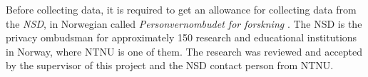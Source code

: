     Before collecting data, it is required to get an allowance for collecting data from the {\it NSD}, in Norwegian called {\it Personvernombudet for forskning} \cite{personvernombud}. The NSD is the privacy ombudsman for approximately 150 research and educational institutions in Norway, where NTNU is one of them. The research was reviewed and accepted by the supervisor of this project and the NSD contact person from NTNU. 

